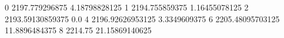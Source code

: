 0 2197.779296875 4.18798828125
1 2194.755859375 1.16455078125
2 2193.59130859375 0.0
4 2196.92626953125 3.3349609375
6 2205.48095703125 11.8896484375
8 2214.75 21.15869140625
